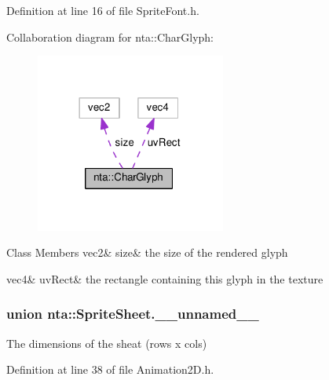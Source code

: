 Definition at line 16 of file Sprite\+Font.\+h.



Collaboration diagram for nta\+:\+:Char\+Glyph\+:\nopagebreak
\begin{figure}[H]
\begin{center}
\leavevmode
\includegraphics[width=177pt]{df/ddc/structnta_1_1CharGlyph__coll__graph}
\end{center}
\end{figure}
\begin{DoxyFields}{Class Members}
\mbox{\label{namespacenta_aa2a40e6fe48ffadb4c7c95af7e82db91}} 
vec2&
size&
the size of the rendered glyph \\
\hline

\mbox{\label{namespacenta_a46d9ea9c38c8bf5e1c1679e938019f53}} 
vec4&
uvRect&
the rectangle containing this glyph in the texture \\
\hline

\end{DoxyFields}
\label{unionnta_1_1SpriteSheet_8____unnamed____}
\subsubsection{union nta\+:\+:Sprite\+Sheet.\+\_\+\+\_\+unnamed\+\_\+\+\_\+}
The dimensions of the sheat (rows x cols) 

Definition at line 38 of file Animation2\+D.\+h.

